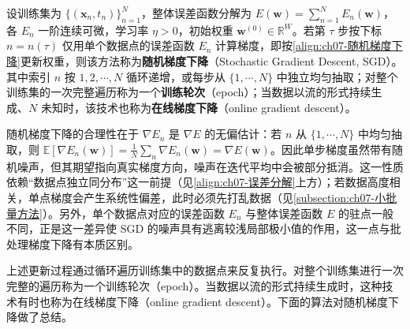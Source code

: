 \documentclass[../../main.tex]{subfiles}
\begin{document}
\begin{definition}[随机梯度下降]\label{definition:ch07-随机梯度下降}
设训练集为 $\{(\mathbf{x}_{n},t_{n})\}_{n=1}^{N}$，整体误差函数分解为 $E(\mathbf{w})=\sum_{n=1}^{N}E_{n}(\mathbf{w})$，各 $E_{n}$ 一阶连续可微，学习率 $\eta>0$，初始权重 $\mathbf{w}^{(0)}\in\mathbb{R}^{W}$。若第 $\tau$ 步按下标 $n=n(\tau)$ 仅用单个数据点的误差函数 $E_{n}$ 计算梯度，即按\eqref{align:ch07-随机梯度下降}更新权重，则该方法称为\textbf{随机梯度下降}（Stochastic Gradient Descent, SGD）。其中索引 $n$ 按 $1,2,\cdots,N$ 循环递增，或每步从 $\{1,\cdots,N\}$ 中独立均匀抽取；对整个训练集的一次完整遍历称为一个\textbf{训练轮次}（epoch）；当数据以流的形式持续生成、$N$ 未知时，该技术也称为\textbf{在线梯度下降}（online gradient descent）。
\end{definition}

\begin{remark}
随机梯度下降的合理性在于 $\nabla E_n$ 是 $\nabla E$ 的无偏估计：若 $n$ 从 $\{1,\cdots,N\}$ 中均匀抽取，则 $\mathbb{E}[\nabla E_n(\mathbf{w})]=\frac{1}{N}\sum_n\nabla E_n(\mathbf{w})=\nabla E(\mathbf{w})$。因此单步梯度虽然带有随机噪声，但其期望指向真实梯度方向，噪声在迭代平均中会被部分抵消。这一性质依赖“数据点独立同分布”这一前提（见\eqref{align:ch07-误差分解}上方）；若数据高度相关，单点梯度会产生系统性偏差，此时必须先打乱数据（见\cref{subsection:ch07-小批量方法}）。另外，单个数据点对应的误差函数 $E_n$ 与整体误差函数 $E$ 的驻点一般不同，正是这一差异使 SGD 的噪声具有逃离较浅局部极小值的作用，这一点与批处理梯度下降有本质区别。
\end{remark}

上述更新过程通过循环遍历训练集中的数据点来反复执行。对整个训练集进行一次完整的遍历称为一个训练轮次（epoch）。当数据以流的形式持续生成时，这种技术有时也称为在线梯度下降（online gradient descent）。下面的算法对随机梯度下降做了总结。
\end{document}
